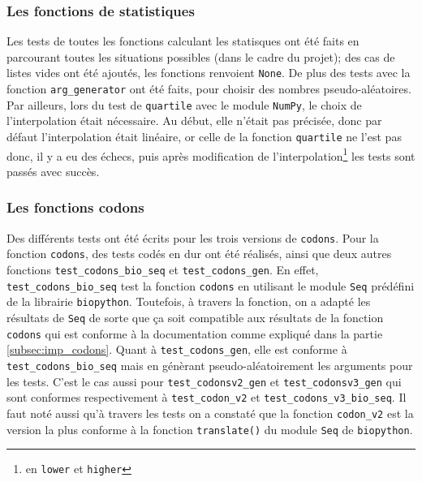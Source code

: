 \documentclass[12pt]{article}
\begin{document}
\subsubsection{Les fonctions de statistiques}
Les tests de toutes les fonctions calculant les statisques ont été faits en parcourant toutes les situations possibles (dans le cadre du projet); des cas de listes vides ont été ajoutés, les fonctions renvoient \texttt{None}. De plus des tests avec la fonction \texttt{arg\_generator} ont été faits, pour choisir des nombres pseudo-aléatoires. Par ailleurs, lors du test de \texttt{quartile} avec le module \texttt{NumPy}, le choix de l'interpolation était nécessaire. Au début, elle n'était pas précisée, donc par défaut l'interpolation était linéaire, or celle de la fonction \texttt{quartile} ne l'est pas donc, il y a eu des échecs, puis après modification de l'interpolation\footnote{en \texttt{lower} et \texttt{higher}} les tests sont passés avec succès.



\subsubsection{Les fonctions codons}
Des différents tests ont été écrits pour les trois versions de \texttt{codons}. 
Pour la fonction \texttt{codons}, des tests codés en dur ont été réalisés, ainsi que deux autres fonctions \texttt{test\_codons\_bio\_seq} et \texttt{test\_codons\_gen}. En effet, \texttt{test\_codons\_bio\_seq} test la fonction \texttt{codons} en utilisant le module \texttt{Seq}  prédéfini de la librairie \texttt{biopython}. Toutefois, à travers la fonction, on a adapté les résultats de \texttt{Seq} de sorte que ça soit compatible aux résultats de la fonction \texttt{codons} qui est conforme à la documentation comme expliqué dans la partie \ref{subsec:imp_codons}.
Quant à \texttt{test\_codons\_gen}, elle est conforme à \texttt{test\_codons\_bio\_seq} mais en génèrant pseudo-aléatoirement les arguments pour les tests.
C'est le cas aussi pour \texttt{test\_codonsv2\_gen} et \texttt{test\_codonsv3\_gen} qui sont conformes respectivement à \texttt{test\_codon\_v2} et \texttt{test\_codons\_v3\_bio\_seq}.
Il faut noté aussi qu'à travers les tests on a constaté que la fonction \texttt{codon\_v2} est la version la plus conforme à la fonction \texttt{translate()} du module \texttt{Seq} de \texttt{biopython}.
\end{document}
